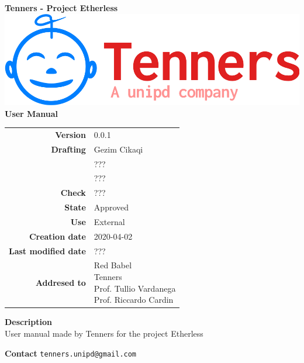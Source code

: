 \begin{titlepage}
	\begin{center}
		\large \textbf{Tenners - Project Etherless}
		\vfill
		\includegraphics[scale = 0.3]{./res/img/logo.png}\\
		\vfill
		\Huge \textbf{User Manual}

        \vfill
        \large

        \begin{tabular}{r|l}
                        \textbf{Version} & 0.0.1 \\
                        \textbf{Drafting} &
                        Gezim Cikaqi\\&
                        ???\\&
						???\\
                        \textbf{Check} &
                        ???\\
                        \textbf{State} & Approved \\
                        \textbf{Use} & External\\
                        \textbf{Creation date} &  2020-04-02\\
                        \textbf{Last modified date} &  ???\\
                        \textbf{Addresed to} & \parbox[t]{5cm}{Red Babel \\Tenners \\Prof. Tullio Vardanega \\Prof. Riccardo Cardin
                        							}
                \end{tabular}
                \vfill
                \normalsize
                \vfill
                                \textbf{Description}
                \\User manual made by Tenners for the project Etherless
                \vfill
                \normalsize
                \vfill
                
                \textbf{Contact}
                \texttt{tenners.unipd@gmail.com}

	\end{center}
\end{titlepage}
